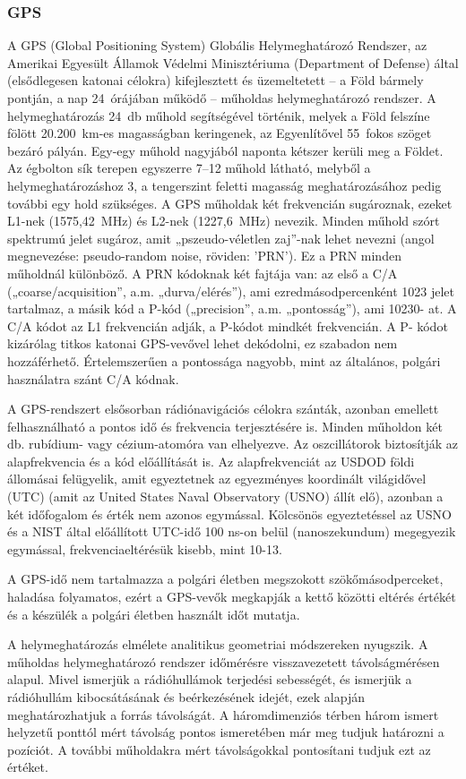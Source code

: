 \subsubsection{GPS}
A GPS (Global Positioning System) Globális Helymeghatározó Rendszer, az
Amerikai Egyesült Államok Védelmi Minisztériuma (Department of Defense)
által (elsődlegesen katonai célokra) kifejlesztett és üzemeltetett -- a Föld bármely pontján, a nap 24~órájában működő -- műholdas helymeghatározó rendszer.
A helymeghatározás 24~db műhold segítségével történik, melyek a Föld felszíne
fölött 20.200~km-es magasságban keringenek, az Egyenlítővel 55~fokos szöget
bezáró pályán. Egy-egy műhold nagyjából naponta kétszer kerüli meg a Földet.
Az égbolton sík terepen egyszerre 7--12 műhold látható, melyből a
helymeghatározáshoz 3, a tengerszint feletti magasság meghatározásához pedig
további egy hold szükséges. A GPS műholdak két frekvencián sugároznak,
ezeket L1-nek (1575,42~MHz) és L2-nek (1227,6~MHz) nevezik. Minden
műhold szórt spektrumú jelet sugároz, amit „pszeudo-véletlen zaj”-nak lehet
nevezni (angol megnevezése: pseudo-random noise, röviden: 'PRN'). Ez a PRN
minden műholdnál különböző. A PRN kódoknak két fajtája van: az első a C/A
(„coarse/acquisition”, a.m. „durva/elérés”), ami ezredmásodpercenként 1023
jelet tartalmaz, a másik kód a P-kód („precision”, a.m. „pontosság”), ami 10230-
at. A C/A kódot az L1 frekvencián adják, a P-kódot mindkét frekvencián. A P-
kódot kizárólag titkos katonai GPS-vevővel lehet dekódolni, ez szabadon nem
hozzáférhető. Értelemszerűen a pontossága nagyobb, mint az általános, polgári
használatra szánt C/A kódnak.

A GPS-rendszert elsősorban rádiónavigációs célokra szánták, azonban emellett
felhasználható a pontos idő és frekvencia terjesztésére is. Minden műholdon két
db. rubídium- vagy cézium-atomóra van elhelyezve. Az oszcillátorok biztosítják
az alapfrekvencia és a kód előállítását is. Az alapfrekvenciát az USDOD földi
állomásai felügyelik, amit egyeztetnek az egyezményes koordinált világidővel
(UTC) (amit az United States Naval Observatory (USNO) állít elő), azonban a
két időfogalom és érték nem azonos egymással. Kölcsönös egyeztetéssel az
USNO és a NIST által előállított UTC-idő 100 ns-on belül (nanoszekundum)
megegyezik egymással, frekvenciaeltérésük kisebb, mint 10-13.

A GPS-idő nem tartalmazza a polgári életben megszokott szökőmásodperceket,
haladása folyamatos, ezért a GPS-vevők megkapják a kettő közötti eltérés
értékét és a készülék a polgári életben használt időt mutatja.

A helymeghatározás elmélete analitikus geometriai módszereken nyugszik. A
műholdas helymeghatározó rendszer időmérésre visszavezetett távolságmérésen
alapul. Mivel ismerjük a rádióhullámok terjedési sebességét, és ismerjük a
rádióhullám kibocsátásának és beérkezésének idejét, ezek alapján meghatározhatjuk a forrás távolságát. A háromdimenziós térben három ismert
helyzetű ponttól mért távolság pontos ismeretében már meg tudjuk határozni a
pozíciót. A további műholdakra mért távolságokkal pontosítani tudjuk ezt az
értéket.